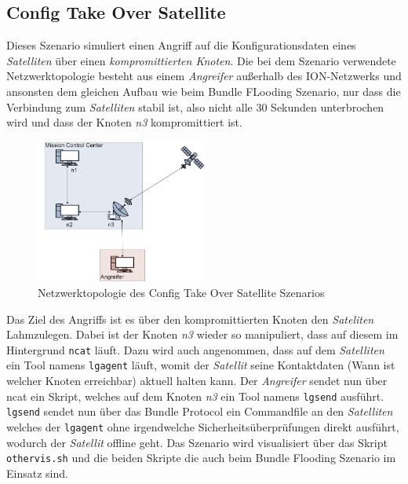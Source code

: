 \documentclass{article}
\begin{document}
\subsection{Config Take Over Satellite}
Dieses Szenario simuliert einen Angriff auf die Konfigurationsdaten eines \textit{Satelliten} über einen \textit{kompromittierten Knoten}. Die bei dem Szenario verwendete Netzwerktopologie besteht aus einem \textit{Angreifer} außerhalb des ION-Netzwerks und ansonsten dem gleichen Aufbau wie beim Bundle FLooding Szenario, nur dass die Verbindung zum \textit{Satelliten} stabil ist, also nicht alle 30 Sekunden unterbrochen wird und dass der Knoten \textit{n3} kompromittiert ist.
\par
\begin{figure}[h]
\centering
\includegraphics[width=0.5\textwidth]{ctos}
\caption{Netzwerktopologie des Config Take Over Satellite Szenarios}
\end{figure}
Das Ziel des Angriffs ist es über den kompromittierten Knoten den \textit{Sateliten} Lahmzulegen.
Dabei ist der Knoten \textit{n3} wieder so manipuliert, dass auf diesem im Hintergrund \texttt{ncat} läuft. Dazu wird auch angenommen, dass auf dem \textit{Satelliten} ein Tool namens \texttt{lgagent} läuft, womit der \textit{Satellit} seine Kontaktdaten (Wann ist welcher Knoten erreichbar) aktuell halten kann.
Der \textit{Angreifer} sendet nun über ncat ein Skript, welches auf dem Knoten \textit{n3} ein Tool namens \texttt{lgsend} ausführt. \texttt{lgsend} sendet nun über das Bundle Protocol ein Commandfile an den \textit{Satelliten} welches der \texttt{lgagent} ohne irgendwelche Sicherheitsüberprüfungen direkt ausführt, wodurch der \textit{Satellit} offline geht.
Das Szenario wird visualisiert über das Skript \texttt{othervis.sh} und die beiden Skripte die auch beim Bundle Flooding Szenario im Einsatz sind.
\end{document}
